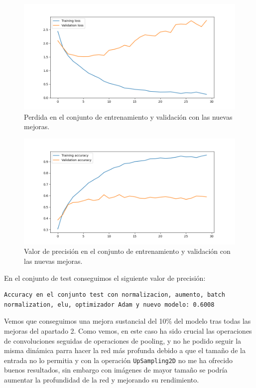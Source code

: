 \documentclass[12pt, spanish]{article}
\begin{document}
\begin{figure}[H]
  \centering
      \includegraphics[width=\textwidth]{bonus.png}
		\caption{Perdida en el conjunto de entrenamiento y validación con las nuevas mejoras.}
\end{figure}

\begin{figure}[H]
  \centering
		\includegraphics[width=\textwidth]{bonus-1.png}
		\caption{Valor de precisión en el conjunto de entrenamiento y validación con las nuevas mejoras.}
\end{figure}



En el conjunto de test conseguimos el siguiente valor de precisión:

\begin{lstlisting}
Accuracy en el conjunto test con normalizacion, aumento, batch normalization, elu, optimizador Adam y nuevo modelo: 0.6008
\end{lstlisting}

Vemos que conseguimos una mejora sustancial del 10\% del modelo tras todas las mejoras del apartado 2. Como vemos, en este caso ha sido crucial las operaciones de convoluciones seguidas de operaciones de pooling, y no he podido seguir la misma dinámica parra hacer la red más profunda debido a que el tamaño de la entrada no lo permitia y con la operación \texttt{UpSampling2D} no me ha ofrecido buenos resultados, sin embargo con imágenes de mayor tamaño se podría aumentar la profundidad de la red y mejorando su rendimiento.
\end{document}
